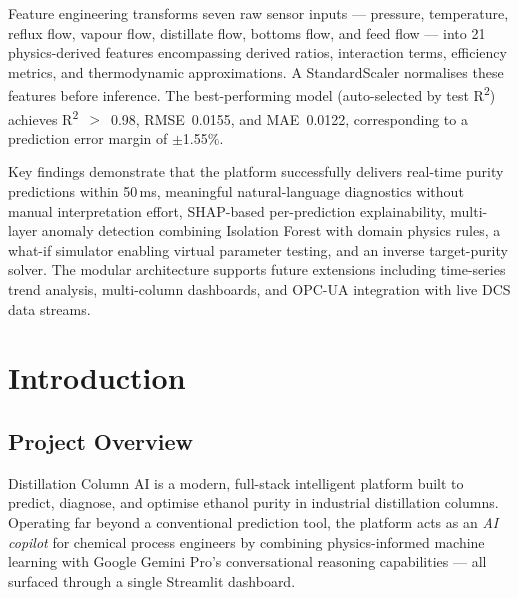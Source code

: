 \documentclass[12pt,a4paper]{report}
\begin{document}
Feature engineering transforms seven raw sensor inputs — pressure, temperature,
reflux flow, vapour flow, distillate flow, bottoms flow, and feed flow — into
21 physics-derived features encompassing derived ratios, interaction terms, efficiency
metrics, and thermodynamic approximations. A StandardScaler normalises these features
before inference. The best-performing model (auto-selected by test R\textsuperscript{2})
achieves R\textsuperscript{2}~$>$~0.98, RMSE~0.0155, and MAE~0.0122, corresponding
to a prediction error margin of $\pm$1.55\%.

Key findings demonstrate that the platform successfully delivers real-time purity
predictions within 50\,ms, meaningful natural-language diagnostics without manual
interpretation effort, SHAP-based per-prediction explainability, multi-layer anomaly
detection combining Isolation Forest with domain physics rules, a what-if simulator
enabling virtual parameter testing, and an inverse target-purity solver. The modular
architecture supports future extensions including time-series trend analysis,
multi-column dashboards, and OPC-UA integration with live DCS data streams.

\clearpage
{\pagestyle{plain}
\tableofcontents
\clearpage}

\pagestyle{fancy}

\chapter{Introduction}

\section{Project Overview}

Distillation Column AI is a modern, full-stack intelligent platform built to predict,
diagnose, and optimise ethanol purity in industrial distillation columns. Operating far
beyond a conventional prediction tool, the platform acts as an \emph{AI copilot}
for chemical process engineers by combining physics-informed machine learning with
Google Gemini Pro's conversational reasoning capabilities — all surfaced through a
single Streamlit dashboard.
\end{document}
